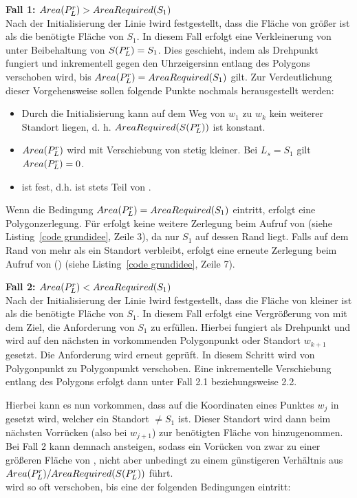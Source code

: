 \documentclass[ngerman]{seminarbeitrag}
\begin{document}
\textbf{Fall 1: $Area(P_{L}^{r})>AreaRequired(S_{1})$} \\
Nach der Initialisierung der Linie \l wird festgestellt, dass die Fläche von \prl größer ist als die benötigte Fläche von $S_{1}$. In diesem Fall erfolgt eine
Verkleinerung von \ar{\mprl} unter Beibehaltung von $S(P_{L}^{r})=S_{1} $. Dies geschieht, indem \Le als Drehpunkt fungiert und \ls inkrementell gegen den Uhrzeigersinn entlang des Polygons
verschoben wird, bis $Area(P_{L}^{r})=AreaRequired(S_{1})$ gilt. Zur Verdeutlichung dieser Vorgehensweise sollen folgende Punkte nochmals herausgestellt werden:

\begin{itemize}
\item Durch die Initialisierung kann auf dem Weg von $w_{1}$ zu $w_{k}$ kein weiterer Standort liegen, d. h. $AreaRequired(S(P_{L}^{r}))$ ist konstant.
\item $Area(P_{L}^{r})$ wird mit Verschiebung von \ls stetig kleiner. Bei $L_{s}=S_{1}$ gilt $Area(P_{L}^{r})=0$.
\item \Le ist fest, d.h.  ist stets Teil von \prl.
\end{itemize}

Wenn die Bedingung $Area(P_{L}^{r})=AreaRequired(S_{1})$ eintritt, erfolgt eine Polygonzerlegung. Für \prl erfolgt keine weitere Zerlegung beim Aufruf von
\con (siehe Listing~\ref{code grundidee}, Zeile 3), da nur $S_{1}$ auf dessen Rand liegt. Falls auf dem Rand von \pll mehr als ein Standort verbleibt, erfolgt eine erneute
Zerlegung beim Aufruf von \con(\pll) (siehe Listing~\ref{code grundidee}, Zeile 7).

\textbf{Fall 2: $Area(P_{L}^{r})<AreaRequired(S_{1})$} \\
Nach der Initialisierung der Linie \l wird festgestellt, dass die Fläche von \prl kleiner ist als die benötigte Fläche von $S_{1}$. In diesem Fall erfolgt eine Vergrößerung von \ar{\mprl} mit dem Ziel, die Anforderung von $S_{1}$ zu erfüllen. Hierbei fungiert \ls als Drehpunkt und \Le wird auf den nächsten in \w vorkommenden Polygonpunkt oder Standort $w_{k+1}$ gesetzt. Die Anforderung wird erneut geprüft. In diesem Schritt wird \Le von Polygonpunkt zu Polygonpunkt verschoben. Eine inkrementelle Verschiebung entlang des Polygons erfolgt dann unter Fall 2.1 beziehungsweise 2.2.

Hierbei kann es nun vorkommen, dass \Le auf die Koordinaten eines Punktes $w_{j}$ in \w gesetzt wird, welcher ein Standort $\ne S_{1}$ ist. Dieser Standort wird dann beim nächsten Vorrücken (also bei $w_{j+1}$) zur benötigten Fläche von \prl hinzugenommen. Bei Fall 2 kann \arreq{\mprl} demnach ansteigen, sodass ein Vorücken von \Le zwar zu einer größeren Fläche von \prl, nicht aber unbedingt zu einem günstigeren Verhältnis aus $Area(P_{L}^{r}) / AreaRequired(S(P_{L}^{r}))$ führt. \\
\Le wird so oft verschoben, bis eine der folgenden Bedingungen eintritt:\\
\end{document}

